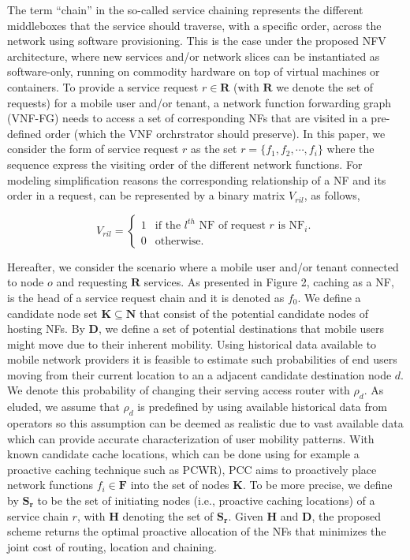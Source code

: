 \documentclass[journal]{IEEEtran}
\begin{document}
The term ``chain'' in the so-called service chaining represents the different middleboxes that the service should traverse, with a specific order, across the network using software provisioning. This is the case under the proposed NFV architecture, where new services and/or network slices can be instantiated as software-only, running on commodity hardware on top of virtual machines or containers. To provide a service request $r\in \mathbf{R}$ (with $\mathbf{R}$ we denote the set of requests) for a mobile user and/or tenant, a network function forwarding graph (VNF-FG)\cite{VNF-FG} needs to access a set of corresponding NFs that are visited in a pre-defined order (which the VNF orchrstrator should preserve). In this paper, we consider the form of service request $r$ as the set $r=\{f_{1}, f_{2}, \cdots, f_{i}\}$ where the sequence express the visiting order of the different network functions. For modeling simplification reasons the corresponding relationship of a NF and its order in a request, can be represented by a binary matrix $V_{ril}$, as follows,

\begin{equation}
  V_{ril} = \left \{
  \begin{array}{rl}
    1 & \text{if the $l^{th}$ NF of request $r$ is NF$_{i}$}. \\
    0 & \text{otherwise}.
  \end{array} \right.
\end{equation}

Hereafter, we consider the scenario where a mobile user and/or tenant connected to node $o$ and requesting $\mathbf{R}$ services. As presented in Figure 2, caching as a NF, is the head of a service request chain and it is denoted as $f_{0}$. We define a candidate node set $\mathbf{K}\subseteq \mathbf{N}$ that consist of the potential candidate nodes of hosting NFs. By $\mathbf{D}$, we define a set of potential destinations that mobile users might move due to their inherent mobility. Using historical data available to mobile network providers it is feasible to  estimate such probabilities of end users moving from their current  location to an a adjacent candidate destination node $d$. We denote this probability of changing their serving access router with $\rho_{d}$. As eluded, we assume that $\rho_{d}$ is predefined by using available historical data from operators so this assumption can be deemed as realistic due to vast available data which can provide accurate  characterization of user mobility patterns. With known candidate cache locations, which can be done using for example a proactive caching technique such as PCWR\cite{PCWR}), PCC aims to proactively place network functions $f_{i}\in \mathbf{F}$ into the set of nodes $\mathbf{K}$. To be more precise, we define by $\mathbf{S_{r}}$ to be the set of initiating nodes (i.e., proactive caching locations) of a service chain $r$, with  $\mathbf{H}$ denoting the set of $\mathbf{S_{r}}$. Given $\mathbf{H}$ and $\mathbf{D}$, the proposed scheme returns the optimal proactive allocation of the NFs that minimizes the joint cost of routing, location and chaining.
\end{document}
